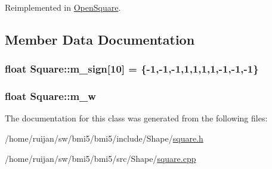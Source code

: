 Reimplemented in \hyperlink{classOpenSquare_aa75c880448b327596b0b5fbde69e561c}{Open\-Square}.



\subsection{Member Data Documentation}
\hypertarget{classSquare_ad4f52dd3d5d29f77db924c3ce447de47}{
\subsubsection[{m\-\_\-sign}]{\setlength{\rightskip}{0pt plus 5cm}float Square\-::m\-\_\-sign\mbox{[}10\mbox{]} = \{-\/1,-\/1,-\/1,1,1,1,1,-\/1,-\/1,-\/1\}}}\label{classSquare_ad4f52dd3d5d29f77db924c3ce447de47}
\hypertarget{classSquare_ab590a983d9ff84dd6d337e40697ae0d6}{
\subsubsection[{m\-\_\-w}]{\setlength{\rightskip}{0pt plus 5cm}float Square\-::m\-\_\-w}}\label{classSquare_ab590a983d9ff84dd6d337e40697ae0d6}


The documentation for this class was generated from the following files\-:\begin{DoxyCompactItemize}
\item 
/home/ruijan/sw/bmi5/bmi5/include/\-Shape/\hyperlink{square_8h}{square.\-h}\item 
/home/ruijan/sw/bmi5/bmi5/src/\-Shape/\hyperlink{square_8cpp}{square.\-cpp}\end{DoxyCompactItemize}
